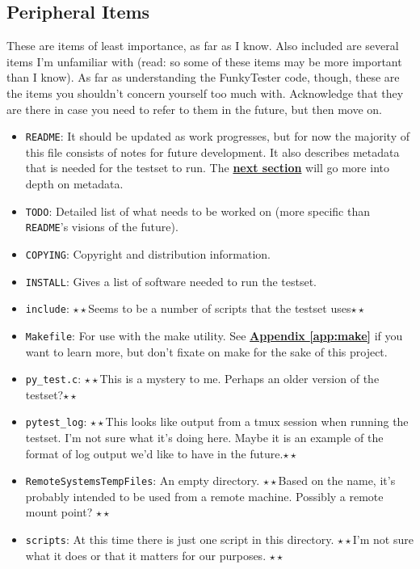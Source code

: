 \documentclass{report}
\newcommand{\dstar}{$\star\star$}	%
\begin{document}
\subsection{Peripheral Items}
These are items of least importance, as far as I know. Also included are several items I'm unfamiliar with (read: so some of these items may be more important than I know). As far as understanding the FunkyTester code, though, these are the items you shouldn't concern yourself too much with. Acknowledge that they are there in case you need to refer to them in the future, but then move on.
\begin{itemize}
	\item \texttt{README}: It should be updated as work progresses, but for now the majority of this file consists of notes for future development. It also describes metadata that is needed for the testset to run. The \hyperref[subsec:medium]{\textbf{next section}} will go more into depth on metadata.
	\item \texttt{TODO}: Detailed list of what needs to be worked on (more specific than \texttt{README}'s visions of the future).
	\item \texttt{COPYING}: Copyright and distribution information.
	\item \texttt{INSTALL}: Gives a list of software needed to run the testset.
	\item \texttt{include}: \dstar Seems to be a number of scripts that the testset uses\dstar
	\item \texttt{Makefile}: For use with the make utility. See \hyperref[app:make]{\textbf{Appendix \ref{app:make}}} if you want to learn more, but don't fixate on make for the sake of this project.
	\item \texttt{py\_test.c}: \dstar This is a mystery to me. Perhaps an older version of the testset?\dstar
	\item \texttt{pytest\_log}: \dstar This looks like output from a tmux session when running the testset. I'm not sure what it's doing here. Maybe it is an example of the format of log output we'd like to have in the future.\dstar
	\item \texttt{RemoteSystemsTempFiles}: An empty directory. \dstar Based on the name, it's probably intended to be used from a remote machine. Possibly a remote mount point? \dstar
	\item \texttt{scripts}: At this time there is just one script in this directory. \dstar I'm not sure what it does or that it matters for our purposes. \dstar
\end{itemize}
\end{document}
